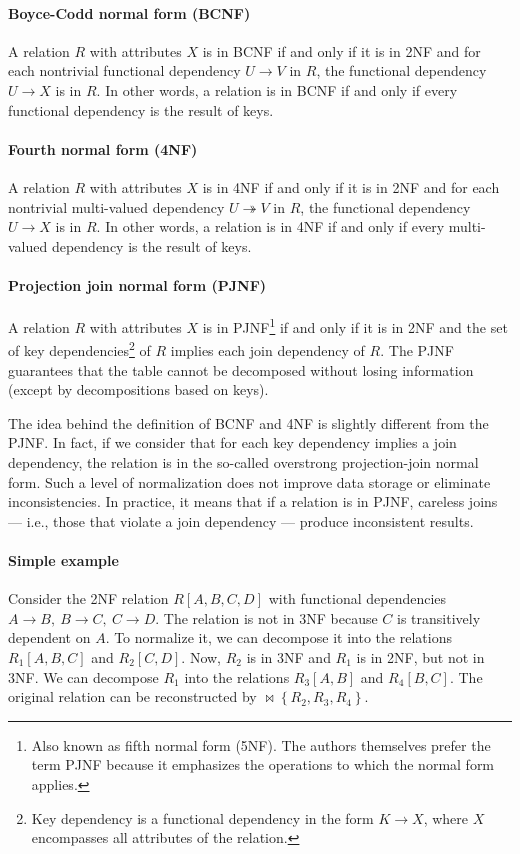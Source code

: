 \paragraph{Boyce-Codd normal form (BCNF)}  A relation $R$ with attributes $X$ is in BCNF
if and only if it is in 2NF and for each nontrivial functional dependency $U \to V$ in
$R$, the functional dependency $U \to X$ is in $R$.  In other words, a relation is in BCNF
if and only if every functional dependency is the result of keys.

\paragraph{Fourth normal form (4NF)}  A relation $R$ with attributes $X$ is in 4NF if
and only if it is in 2NF and for each nontrivial multi-valued dependency $U \twoheadrightarrow
V$ in $R$, the functional dependency $U \to X$ is in $R$.  In other words, a relation is
in 4NF if and only if every multi-valued dependency is the result of keys.

\paragraph{Projection join normal form (PJNF)} A relation $R$ with attributes $X$ is in
PJNF\footnote{Also known as fifth normal form (5NF).  The authors themselves prefer
the term PJNF because it emphasizes the operations to which the normal form applies.}
if and only if it is in 2NF and
the set of key dependencies\footnote{Key dependency is a functional dependency in the form
$K \to X$, where $X$ encompasses all attributes of the relation.} of $R$ implies each join
dependency of $R$.  The PJNF guarantees that the
table cannot be decomposed without losing information (except by decompositions based on
keys).

The idea behind the definition of BCNF and 4NF is slightly different from the
PJNF.  In fact, if we consider that for each key dependency implies a join dependency, the
relation is in the so-called overstrong projection-join normal
form.  Such a level of normalization does not improve data storage
or eliminate inconsistencies.  In practice, it means that if a relation is in PJNF,
careless joins --- i.e., those that violate a join dependency --- produce
inconsistent results.

\paragraph{Simple example}  Consider the 2NF relation $R[A, B, C, D]$ with functional
dependencies $A \to B,~B \to C,~C \to D$.  The relation is not in 3NF because $C$ is
transitively dependent on $A$.  To normalize it, we can decompose it into the
relations $R_1[A, B, C]$ and $R_2[C, D]$.  Now, $R_2$ is in 3NF and $R_1$ is in 2NF, but
not in 3NF.  We can decompose $R_1$ into the relations $R_3[A, B]$ and $R_4[B, C]$.
The original relation can be reconstructed by $\bowtie \left\{ R_2, R_3, R_4 \right\}$.

